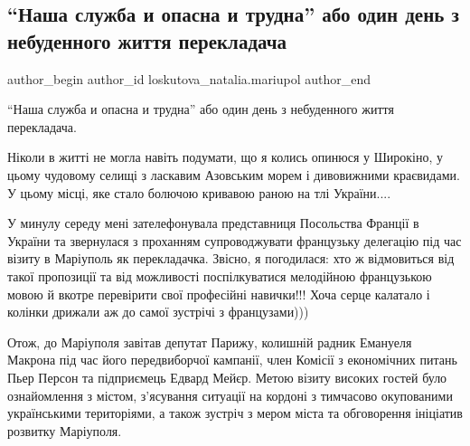  
 
 
 
 

\subsection{\enquote{Наша служба и опасна и трудна} або один день з небуденного життя перекладача}
\label{sec:20_06_2021.fb.loskutova_natalia.mariupol.1._nasha_sluzhba_i_opa}

\ifcmt
 author_begin
   author_id loskutova_natalia.mariupol
 author_end
\fi

\enquote{Наша служба и опасна и трудна} або один день з небуденного життя перекладача.

Ніколи в житті не могла навіть подумати, що я колись опинюся у Широкіно, у
цьому чудовому селищі з ласкавим Азовським морем і дивовижними краєвидами. У
цьому місці, яке стало болючою кривавою раною на тлі України.... 

У минулу середу мені зателефонувала представниця Посольства Франції в України
та звернулася з проханням супроводжувати французьку делегацію під час візиту в
Маріуполь як перекладачка. Звісно, я погодилася: хто ж відмовиться від такої
пропозиції та від можливості поспілкуватися мелодійною французькою мовою й
вкотре перевірити свої професійні навички!!! Хоча серце калатало і колінки
дрижали аж до самої зустрічі з французами))) 

Отож, до Маріуполя завітав депутат Парижу, колишній радник Емануеля Макрона під
час його передвиборчої кампанії, член Комісії з економічних питань Пьер Персон
та підприємець Едвард Мейєр. Метою візиту високих гостей було ознайомлення з
містом, з'ясування ситуації на кордоні з тимчасово окупованими українськими
територіями, а також зустріч з мером міста та обговорення ініціатив розвитку
Маріуполя. 


